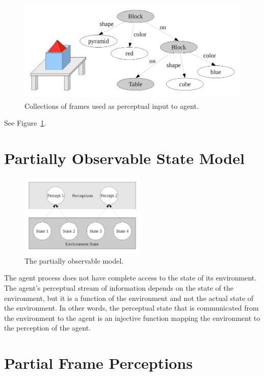 \begin{figure}[bth]
  \center
  \includegraphics[height=5cm]{gfx/frame_perception}
  \caption[Collections of frames used as perceptual input to agent.]{Collections of frames used as perceptual input to agent.}
  \label{fig:frame_perception}
\end{figure}

See Figure~\ref{fig:frame_perception}.


\section{Partially Observable State Model}

\begin{figure}[bth]
  \center
  \includegraphics[width=6cm]{gfx/partially_observable}
  \caption[The partially observable state model]{The partially observable model.}
  \label{fig:partially_observable}
\end{figure}

The agent process does not have complete access to the state of its
environment.  The agent's perceptual stream of information depends on
the state of the environment, but it is a function of the environment
and not the actual state of the environment.  In other words, the
perceptual state that is communicated from the environment to the
agent is an injective function mapping the environment to the
perception of the agent.


\section{Partial Frame Perceptions}

